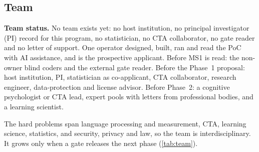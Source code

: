 \subsection{Team}

\begin{evfutbox}
  \textbf{Team status.} No team exists yet: no host institution, no principal investigator (PI) record
  for this program, no statistician, no CTA collaborator, no gate reader and no letter of support. One
  operator designed, built, ran and read the PoC with AI assistance, and is the prospective applicant.
  Before MS1 is read: the non-owner blind coders and the external gate reader. Before the Phase~1
  proposal: host institution, PI, statistician as co-applicant, CTA collaborator, research engineer,
  data-protection and license advisor. Before Phase~2: a cognitive psychologist or CTA lead, expert
  pools with letters from professional bodies, and a learning scientist.
\end{evfutbox}

\evint{} The hard problems span language processing and measurement, CTA, learning science, statistics,
and security, privacy and law, so the team is interdisciplinary. It grows only when a gate releases the
next phase (\cref{tab:team}).

